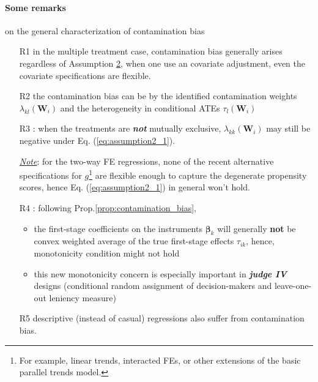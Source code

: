 \documentclass[twoside]{article}
\begin{document}
\paragraph*{Some remarks} on the general characterization of contamination bias 
\begin{itemize}
    \item[R1] in the multiple treatment case, contamination bias generally arises regardless of Assumption \hyperref[assumption2]{2}, when one use an  covariate adjustment, even the covariate specifications are flexible.
    \item[R2] the contamination bias can be  by the identified contamination weights $\lambda_{kl}(\mathbf{W}_i)$ and the heterogeneity in conditional ATEs $\tau_l(\mathbf{W}_i)$
    \item[R3] : when the treatments are \textbf{\textit{not}} mutually exclusive, $\lambda_{kk}(\mathbf{W}_i)$ may still be negative under Eq. (\ref{eq:assumption2_1}).
    
    \underline{\textit{Note}}: for the two-way FE regressions, none of the recent alternative specifications for $g$\footnote{For example, linear trends, interacted FEs, or other extensions of the basic parallel trends model.} are flexible enough to capture the degenerate propensity scores, hence Eq. (\ref{eq:assumption2_1}) in general won't hold.
    \item[R4] : following Prop.\ref{prop:contamination_bias}, 
    \begin{itemize}
        \item the first-stage coefficients on the instruments $\boldsymbol{\beta}_k$ will generally \textbf{not} be convex weighted average of the true first-stage effects $\tau_{ik}$, hence, monotonicity condition might not hold
        \item this new monotonicity concern is especially important in \textbf{\textit{judge IV}} designs (conditional random assignment of decision-makers and leave-one-out leniency measure)
    \end{itemize}
    \item[R5] descriptive (instead of casual) regressions also suffer from contamination bias.
\end{itemize}
\end{document}
